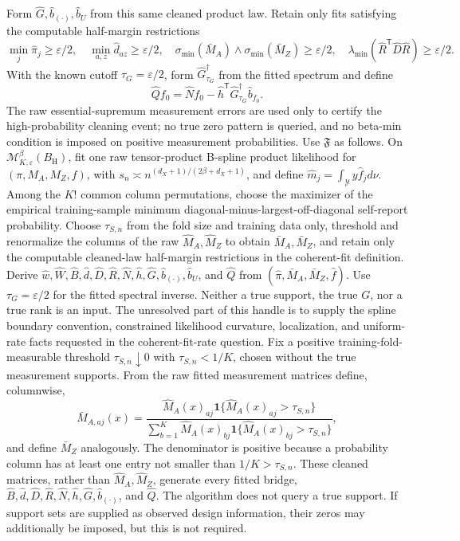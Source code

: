 Form \(\widehat G,\widehat b_{(\cdot)},\widehat b_U\) from this same cleaned product law.  Retain only fits satisfying the computable half-margin restrictions
\[
 \min_j\widehat\pi_j\geq\varepsilon/2,
 \quad \min_{a,z}\widehat d_{az}\geq\varepsilon/2,
 \quad \sigma_{\min}(\bar M_A)\wedge\sigma_{\min}(\bar M_Z)\geq\varepsilon/2,
 \quad \lambda_{\min}(\widehat R^{\mathsf T}\widehat D\widehat R)\geq\varepsilon/2.
\]
With the known cutoff \(\tau_G=\varepsilon/2\), form \(\widehat G_{\tau_G}^{\dagger}\) from the fitted spectrum and define
\[
 \widehat Qf_0=\widehat Nf_0-
 \widehat h^{\mathsf T}\widehat G_{\tau_G}^{\dagger}\widehat b_{f_0}.
\]
The raw essential-supremum measurement errors are used only to certify the high-probability cleaning event; no true zero pattern is queried, and no beta-min condition is imposed on positive measurement probabilities.
Use \(\mathfrak F\) as follows.  On \(\mathcal M^{\beta}_{K,\varepsilon}(B_{\mathrm H})\), fit one raw tensor-product B-spline product likelihood for \((\pi,M_A,M_Z,f)\), with \(s_n\asymp n^{(d_X+1)/(2\beta+d_X+1)}\), and define \(\widehat m_j=\int_{\mathcal Y}y\widehat f_jd\nu\).  Among the \(K!\) common column permutations, choose the maximizer of the empirical training-sample minimum diagonal-minus-largest-off-diagonal self-report probability.  Choose \(\tau_{S,n}\) from the fold size and training data only, threshold and renormalize the columns of the raw \(\widehat M_A,\widehat M_Z\) to obtain \(\bar M_A,\bar M_Z\), and retain only the computable cleaned-law half-margin restrictions in the coherent-fit definition.  Derive \(\widehat w,\widehat W,\widehat B,\widehat d,\widehat D,\widehat R,\widehat N,\widehat h,\widehat G,\widehat b_{(\cdot)},\widehat b_U\), and \(\widehat Q\) from \((\widehat\pi,\bar M_A,\bar M_Z,\widehat f)\).  Use \(\tau_G=\varepsilon/2\) for the fitted spectral inverse.  Neither a true support, the true \(G\), nor a true rank is an input.  The unresolved part of this handle is to supply the spline boundary convention, constrained likelihood curvature, localization, and uniform-rate facts requested in the coherent-fit-rate question.
Fix a positive training-fold-measurable threshold \(\tau_{S,n}\downarrow0\) with \(\tau_{S,n}<1/K\), chosen without the true measurement supports.  From the raw fitted measurement matrices define, columnwise,
\[
 \bar M_{A,aj}(x)=
 \frac{\widehat M_A(x)_{aj}\mathbf 1\{\widehat M_A(x)_{aj}>\tau_{S,n}\}}
 {\sum_{b=1}^K\widehat M_A(x)_{bj}\mathbf 1\{\widehat M_A(x)_{bj}>\tau_{S,n}\}},
\]
and define \(\bar M_Z\) analogously.  The denominator is positive because a probability column has at least one entry not smaller than \(1/K>\tau_{S,n}\).  These cleaned matrices, rather than \(\widehat M_A,\widehat M_Z\), generate every fitted bridge, \(\widehat B,\widehat d,\widehat D,\widehat R,\widehat N,\widehat h,\widehat G,\widehat b_{(\cdot)}\), and \(\widehat Q\).  The algorithm does not query a true support.  If support sets are supplied as observed design information, their zeros may additionally be imposed, but this is not required.

